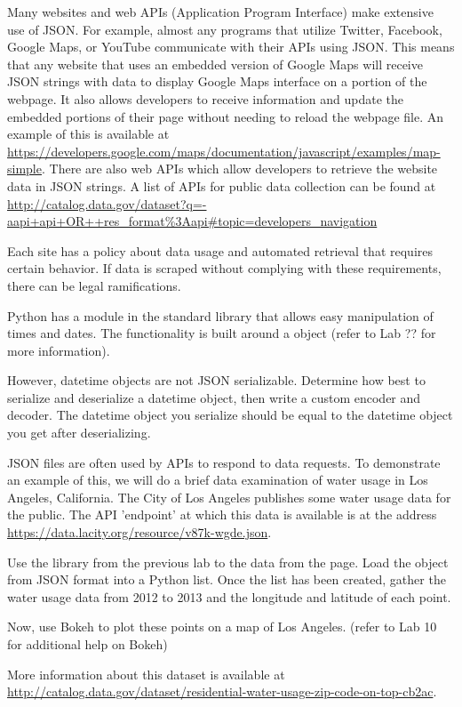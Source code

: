 Many websites and web APIs (Application Program Interface) make extensive use of JSON. 
For example, almost any programs that utilize Twitter, Facebook, Google Maps, or YouTube communicate with their APIs using JSON. 
This means that any website that uses an embedded version of Google Maps will receive JSON strings with data to display Google Maps interface on a portion of the webpage.
It also allows developers to receive information and update the embedded portions of their page without needing to reload the webpage file.
An example of this is available at \url{https://developers.google.com/maps/documentation/javascript/examples/map-simple}.
There are also web APIs which allow developers to retrieve the website data in JSON strings.
A list of APIs for public data collection can be found at \url{http://catalog.data.gov/dataset?q=-aapi+api+OR++res_format%3Aapi#topic=developers_navigation}
\begin{warn}
Each site has a policy about data usage and automated retrieval that requires certain behavior.
If data is scraped without complying with these requirements, there can be legal ramifications.
\end{warn}

\begin{problem}
Python has a module in the standard library that allows easy manipulation of times and dates. The functionality is built around a  object (refer to Lab ?? for more information).

However, datetime objects are not JSON serializable.
Determine how best to serialize and deserialize a datetime object, then write a custom encoder and decoder.
The datetime object you serialize should be equal to the datetime object you get after deserializing.
\label{prob:datetime_json}
\end{problem}

\begin{problem}
JSON files are often used by APIs to respond to data requests.
To demonstrate an example of this, we will do a brief data examination of water usage in Los Angeles, California.
The City of Los Angeles publishes some water usage data for the public.
The API 'endpoint' at which this data is available is at the address \url{https://data.lacity.org/resource/v87k-wgde.json}.

Use the  library from the previous lab to  the data from the page. Load the object from JSON format into a Python list.
Once the list has been created, gather the water usage data from 2012 to 2013 and the longitude and latitude of each point.

Now, use Bokeh to plot these points on a map of Los Angeles. (refer to Lab 10 for additional help on Bokeh)

More information about this dataset is available at \url{http://catalog.data.gov/dataset/residential-water-usage-zip-code-on-top-cb2ac}.
\end{problem}


